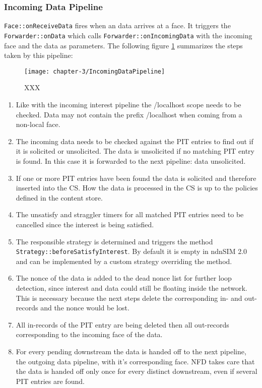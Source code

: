 \subsubsection{Incoming Data Pipeline}

 \texttt{Face::onReceiveData} fires when an data arrives at a face. It triggers the  \texttt{Forwarder::onData} which calls \texttt{Forwarder::onIncomingData} with the incoming face and the data as parameters.
The following figure \ref{fig:IncomingDataPipeline} summarizes the steps taken by this pipeline:

\begin{figure}[H]
  \centering
  \texttt{[image: chapter-3/IncomingDataPipeline]}
  \caption{XXX}
  \label{fig:IncomingDataPipeline}
\end{figure}

\begin{enumerate}
\item Like with the incoming interest pipeline the /localhost scope needs to be checked. Data may not contain the prefix /localhost when coming from a non-local face.
\item The incoming data needs to be checked against the PIT entries to find out if it is solicited or unsolicited. The data is unsolicited if no matching PIT entry is found. In this case it is forwarded to the next pipeline: data unsolicited.
\item If one or more PIT entries have been found the data is solicited and therefore inserted into the CS. How the data is processed in the CS is up to the policies defined in the content store.
\item The unsatisfy and straggler timers for all matched PIT entries need to be cancelled since the interest is being satisfied.
\item The responsible strategy is determined and triggers the method \texttt{Strategy::beforeSatisfyInterest}. By default it is empty in ndnSIM 2.0 and can be implemented by a custom strategy overriding the method.
\item The nonce of the data is added to the dead nonce list for further loop detection, since interest and data could still be floating inside the network. This is necessary because the next steps delete the corresponding in- and out-records and the nonce would be lost. 
\item All in-records of the PIT entry are being deleted then all out-records corresponding to the incoming face of the data.
\item For every pending downstream the data is handed off to the next pipeline, the outgoing data pipeline, with it's corresponding face. NFD takes care that the data is handed off only once for every distinct downstream, even if several PIT entries are found.
\end{enumerate}

